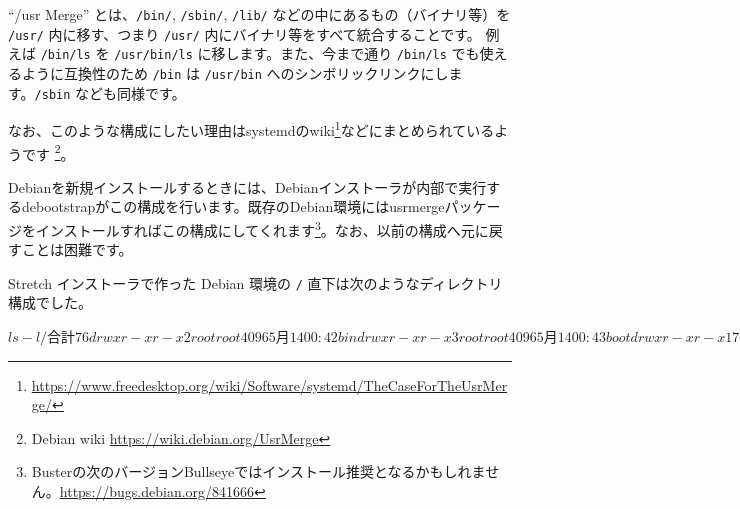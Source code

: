 \documentclass[mingoth,a4paper]{jsarticle}
\begin{document}
``/usr Merge'' とは、\verb|/bin/|, \verb|/sbin/|, \verb|/lib/| などの中にあるもの（バイナリ等）を \verb|/usr/| 内に移す、つまり \verb|/usr/| 内にバイナリ等をすべて統合することです。
例えば \verb|/bin/ls| を \verb|/usr/bin/ls| に移します。また、今まで通り \verb|/bin/ls| でも使えるように互換性のため \verb|/bin| は \verb|/usr/bin| へのシンボリックリンクにします。\verb|/sbin| なども同様です。

なお、このような構成にしたい理由はsystemdのwiki\footnote{\url{https://www.freedesktop.org/wiki/Software/systemd/TheCaseForTheUsrMerge/}}などにまとめられているようです
\footnote{Debian wiki \url{https://wiki.debian.org/UsrMerge}}。

Debianを新規インストールするときには、Debianインストーラが内部で実行するdebootstrapがこの構成を行います。既存のDebian環境にはusrmergeパッケージをインストールすればこの構成にしてくれます\footnote{Busterの次のバージョンBullseyeではインストール推奨となるかもしれません。\url{https://bugs.debian.org/841666}}。なお、以前の構成へ元に戻すことは困難です。

Stretch インストーラで作った Debian 環境の \verb|/| 直下は次のようなディレクトリ構成でした。
\begin{commandline}
$ ls -l /
合計 76
drwxr-xr-x  2 root root  4096  5月 14 00:42 bin
drwxr-xr-x  3 root root  4096  5月 14 00:43 boot
drwxr-xr-x 17 root root  2980  5月 14 00:56 dev
drwxr-xr-x 76 root root  4096  5月 14 00:56 etc
drwxr-xr-x  3 root root  4096  5月 14 00:43 home
lrwxrwxrwx  1 root root    29  5月 14 00:38 initrd.img -> boot/initrd.img-4.9.0-9-amd64
lrwxrwxrwx  1 root root    29  5月 14 00:38 initrd.img.old -> boot/initrd.img-4.9.0-9-amd64
drwxr-xr-x 15 root root  4096  5月 14 00:42 lib
drwxr-xr-x  2 root root  4096  5月 14 00:36 lib64
drwx------  2 root root 16384  5月 14 00:35 lost+found
drwxr-xr-x  3 root root  4096  5月 14 00:35 media
drwxr-xr-x  2 root root  4096  5月 14 00:35 mnt
drwxr-xr-x  2 root root  4096  5月 14 00:35 opt
dr-xr-xr-x 80 root root     0  5月 14  2019 proc
drwx------  2 root root  4096  5月 14 00:35 root
drwxr-xr-x 14 root root   460  5月 14 00:57 run
drwxr-xr-x  2 root root  4096  5月 14 00:56 sbin
drwxr-xr-x  2 root root  4096  5月 14 00:35 srv
dr-xr-xr-x 13 root root     0  5月 14 00:57 sys
drwxrwxrwt  8 root root  4096  5月 14 00:56 tmp
drwxr-xr-x 10 root root  4096  5月 14 00:35 usr
drwxr-xr-x 11 root root  4096  5月 14 00:35 var
lrwxrwxrwx  1 root root    26  5月 14 00:38 vmlinuz -> boot/vmlinuz-4.9.0-9-amd64
lrwxrwxrwx  1 root root    26  5月 14 00:38 vmlinuz.old -> boot/vmlinuz-4.9.0-9-amd64
$ 
\end{commandline}
\end{document}
